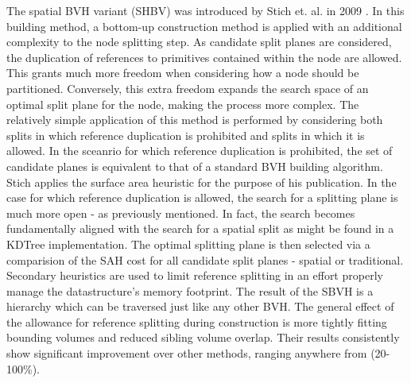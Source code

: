 \documentclass[12pt, a4paper]{article}
\begin{document}
The spatial BVH variant (SHBV) was introduced by Stich et. al. in 2009 \cite{Stich_2009}. In this building method, a bottom-up construction method is applied with an additional complexity to the node splitting step. As candidate split planes are considered, the duplication of references to primitives contained within the node are allowed. This grants much more freedom when considering how a node should be partitioned. Conversely, this extra freedom expands the search space of an optimal split plane for the node, making the process more complex. The relatively simple application of this method is performed by considering both splits in which reference duplication is prohibited and splits in which it is allowed. In the sceanrio for which reference duplication is prohibited, the set of candidate planes is equivalent to that of a standard BVH building algorithm. Stich applies the surface area heuristic for the purpose of his publication. In the case for which reference duplication is allowed, the search for a splitting plane is much more open - as previously mentioned. In fact, the search becomes fundamentally aligned with the search for a spatial split as might be found in a KDTree implementation. The optimal splitting plane is then selected via a comparision of the SAH cost for all candidate split planes - spatial or traditional. Secondary heuristics are used to limit reference splitting in an effort properly manage the datastructure's memory footprint. The result of the SBVH is a hierarchy which can be traversed just like any other BVH. The general effect of the allowance for reference splitting during construction is more tightly fitting bounding volumes and reduced sibling volume overlap. Their results consistently show significant improvement over other methods, ranging anywhere from (20-100\%).\cite{Stich_2009}

\end{document}
